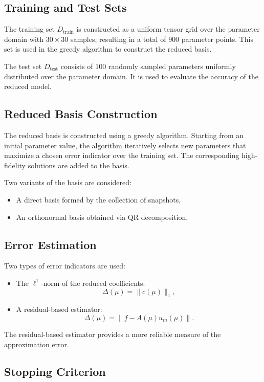 \documentclass[11pt]{article}      %
\begin{document}
\subsection{Training and Test Sets}

The training set $D_{\text{train}}$ is constructed as a uniform tensor grid over the parameter domain with $30 \times 30$ samples, resulting in a total of $900$ parameter points. This set is used in the greedy algorithm to construct the reduced basis.

The test set $D_{\text{test}}$ consists of $100$ randomly sampled parameters uniformly distributed over the parameter domain. It is used to evaluate the accuracy of the reduced model.

\subsection{Reduced Basis Construction}

The reduced basis is constructed using a greedy algorithm. Starting from an initial parameter value, the algorithm iteratively selects new parameters that maximize a chosen error indicator over the training set. The corresponding high-fidelity solutions are added to the basis.

Two variants of the basis are considered:
\begin{itemize}
	\item A direct basis formed by the collection of snapshots,
	\item An orthonormal basis obtained via QR decomposition.
\end{itemize}

\subsection{Error Estimation}

Two types of error indicators are used:
\begin{itemize}
	\item The $\ell^1$-norm of the reduced coefficients:
	\[
	\Delta(\mu) = \|c(\mu)\|_1,
	\]
	\item A residual-based estimator:
	\[
	\Delta(\mu) = \|f - A(\mu) u_m(\mu)\|.
	\]
\end{itemize}
The residual-based estimator provides a more reliable measure of the approximation error.

\subsection{Stopping Criterion}
\end{document}
